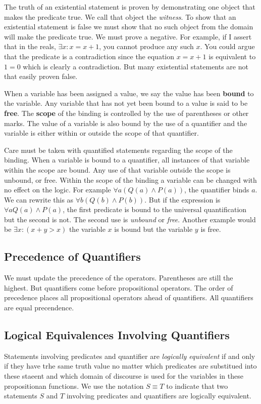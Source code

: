 The truth of an existential statement is proven by demonstrating one object that makes the predicate true. We call that object the \textit{witness}. To show that an existential statement is false we must show that no such object from the domain will make the predicate true. We must prove a negative. For example, if I assert that in the reals, $\exists x: x=x+1$, you cannot produce any such $x$. You could argue that the predicate is a contradiction since the equation $x=x+1$ is equivalent to $1=0$ which is clearly a contradiction. But many existential statements are not that easily proven false.

  

    
\begin{definition}
When a variable has been assigned a value, we say the value has been \textbf{bound} to the variable. Any variable that has not yet been bound to a value is said to be \textbf{free}. The \textbf{scope} of the binding is controlled by the use of parentheses or other marks. The value of a variable is also bound by the use of a quantifier and the variable is either within or outside the scope of that quantifier.
\end{definition}

Care must be taken  with quantified statements regarding the scope of the binding. When a variable is bound to a quantifier, all instances of that variable within the scope are bound. Any use of that variable outside the scope is unbound, or free. Within the scope of the binding a variable can be changed with no effect on the logic. For example $\forall a (Q(a) \land P(a))$, the quantifier binds $a$. We can rewrite this as $\forall b(Q(b) \land P(b))$. But if the expression is $\forall a Q(a) \land P(a)$, the first predicate is bound to the universal quantification but the second is not. The second use is \textit{unbound} or \textit{free}. Another example would be $\exists x:(x+y>x)$ the variable $x$ is bound but the variable $y$ is free.

\subsection {Precedence of Quantifiers}
We must update the precedence of the operators. Parentheses are still the  highest. But quantifiers come before propositional operators. The order of precedence places all propositional operators ahead of quantifiers. All quantifiers are equal precendence.


    \subsection {Logical Equivalences Involving Quantifiers}
\begin{definition}
Statements involving predicates and quantifier are \textit{logically equivalent} if and only if they have trhe same truth value no matter which predicates are substitued into these staeent and which domain of discourse is used for the variables in these propositionan functions. We use the notation $S \equiv T$ to indicate that two statements $S$ and $T$ involving predicates and quantifiers are logically equivalent.
\end{definition}

